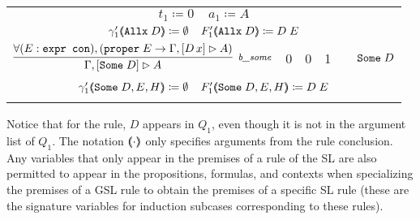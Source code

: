\begin{tabular}{ c c c c c c }
\multicolumn{6}{c}{$t_1 \coloneqq 0 \;\;\;\; a_1 \coloneqq A$} \\
\multicolumn{6}{c}{$\gamma'_1 (\hspace{-0.35em} \langle \texttt{Allx} \; D \rangle \hspace{-0.35em}) \coloneqq \emptyset \;\;\;\; F'_1 (\hspace{-0.35em} \langle \texttt{Allx} \; D \rangle \hspace{-0.35em}) \coloneqq D \; E$} \\
\noalign{\smallskip} \hline \hline \noalign{\smallskip}
$\vcenter{\rlbsome{}}$ & 0 & 0 & 1 & \dyncon{} & $\texttt{Some} \; D$ \\
\noalign{\smallskip} \hline \noalign{\smallskip}
\multicolumn{6}{c}{$t_1 \coloneqq 2 \;\;\;\; y_{1,1} \coloneqq E \;\;\;\; S_{1,1} \coloneqq \sltm{expr con} \;\;\;\; y_{1,2} \coloneqq H \;\;\;\; S_{1,2} \coloneqq \sltm{proper} \; E \;\;\;\; a_1 \coloneqq A$} \\
\multicolumn{6}{c}{$\gamma'_1 (\hspace{-0.35em} \langle \texttt{Some} \; D , E , H \rangle \hspace{-0.35em}) \coloneqq \emptyset \;\;\;\; F'_1 (\hspace{-0.35em} \langle \texttt{Some} \; D , E , H \rangle \hspace{-0.35em}) \coloneqq D \; E$} \\
\noalign{\smallskip} \hline
\end{tabular}

\bigskip

Notice that for the \rlnmsinit{} rule, $D$ appears in $Q_1$, even though it is not in the argument list of $Q_1$. The notation $(\hspace{-0.35em} \langle \cdot \rangle \hspace{-0.35em})$ only specifies arguments from the rule conclusion. Any variables that only appear in the premises of a rule of the SL are also permitted to appear in the propositions, formulas, and contexts when specializing the premises of a GSL rule to obtain the premises of a specific SL rule (these are the signature variables for induction subcases corresponding to these rules).




